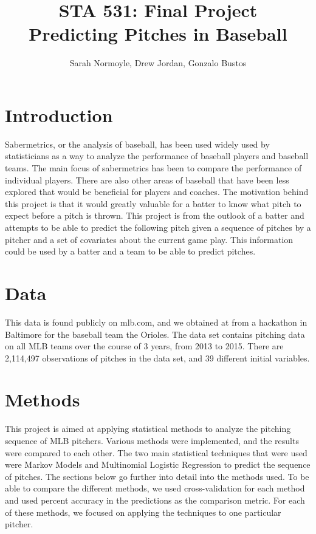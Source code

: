 \documentclass{article}
\begin{document}
\title{STA 531: Final Project \\ Predicting Pitches in Baseball}
\author{Sarah Normoyle, Drew Jordan, Gonzalo Bustos}

\maketitle 

\section{Introduction}

Sabermetrics, or the analysis of baseball, has been used widely used by statisticians as a way to analyze the performance of baseball players and baseball teams. The main focus of sabermetrics has been to compare the performance of individual players. There are also other areas of baseball that have been less explored that would be beneficial for players and coaches. The motivation behind this project is that it would greatly valuable for a batter to know what pitch to expect before a pitch is thrown. This project is from the outlook of a batter and attempts to be able to predict the following pitch given a sequence of pitches by a pitcher and a set of covariates about the current game play. This information could be used by a batter and a team to be able to predict pitches. 

\section{Data}

This data is found publicly on mlb.com, and we obtained at from a hackathon in Baltimore for the baseball team the Orioles. The data set contains pitching data on all MLB teams over the course of 3 years, from 2013 to 2015. There are 2,114,497 observations of pitches in the data set, and 39 different initial variables. 


\section{Methods}

This project is aimed at applying statistical methods to analyze the pitching sequence of MLB pitchers. Various methods were implemented, and the results were compared to each other. The two main statistical techniques that were used were Markov Models and Multinomial Logistic Regression to predict the sequence of pitches. The sections below go further into detail into the methods used. To be able to compare the different methods, we used cross-validation for each method and used percent accuracy in the predictions as the comparison metric. For each of these methods, we focused on applying the techniques to one particular pitcher.
\end{document}

